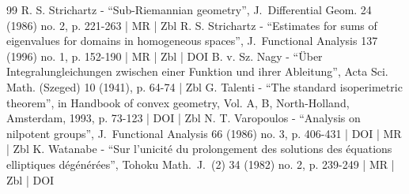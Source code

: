 \begin{thebibliography}{99}
R. S. Strichartz - “Sub-Riemannian geometry”, J. Differential Geom. 24 (1986) no. 2, p. 221-263 | MR | Zbl
R. S. Strichartz - “Estimates for sums of eigenvalues for domains in homogeneous spaces”, J. Functional Analysis 137 (1996) no. 1, p. 152-190 | MR | Zbl | DOI
B. v. Sz. Nagy - “Über Integralungleichungen zwischen einer Funktion und ihrer Ableitung”, Acta Sci. Math. (Szeged) 10 (1941), p. 64-74 | Zbl
G. Talenti - “The standard isoperimetric theorem”, in Handbook of convex geometry, Vol. A, B, North-Holland, Amsterdam, 1993, p. 73-123 | DOI | Zbl
N. T. Varopoulos - “Analysis on nilpotent groups”, J. Functional Analysis 66 (1986) no. 3, p. 406-431 | DOI | MR | Zbl
K. Watanabe - “Sur l’unicité du prolongement des solutions des équations elliptiques dégénérées”, Tohoku Math. J. (2) 34 (1982) no. 2, p. 239-249 | MR | Zbl | DOI
\end{thebibliography}
